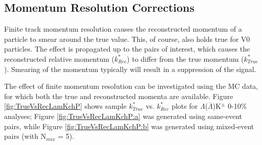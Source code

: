 \documentclass[../AnalysisNoteJBuxton.tex]{subfiles}
\begin{document}
\subsection{Momentum Resolution Corrections}
\label{MomentumResolutionCorrections}

Finite track momentum resolution causes the reconstructed momentum of a particle to smear around the true value.
This, of course, also holds true for V0 particles.
The effect is propagated up to the pairs of interest, which causes the reconstructed relative momentum ($k^{*}_{Rec}$) to differ from the true momentum ($k^{*}_{True}$).
Smearing of the momentum typically will result in a suppression of the signal.

The effect of finite momentum resolution can be investigated using the MC data, for which both the true and reconstructed momenta are available.
Figure \ref{fig:TrueVsRecLamKchP} shows sample $k^{*}_{True}$ vs. $k^{*}_{Rec}$ plots for $\Lambda$($\bar{\Lambda}$)K$^{\pm}$ 0-10\% analyses; Figure \ref{fig:TrueVsRecLamKchP:a} was generated using same-event pairs, while Figure \ref{fig:TrueVsRecLamKchP:b} was generated using mixed-event pairs (with N$_{mix}$ = 5).  
\end{document}
